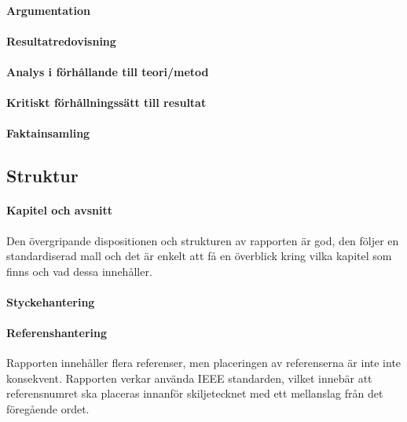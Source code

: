     \paragraph{Argumentation}

    \paragraph{Resultatredovisning}

    \paragraph{Analys i förhållande till teori/metod  }

    \paragraph{Kritiskt förhållningssätt till resultat}

    \paragraph{Faktainsamling}


    \subsection{Struktur} %
    \label{sub:struktur}
    \paragraph{Kapitel och avsnitt}
        Den övergripande dispositionen och strukturen av rapporten är god, den följer en standardiserad mall och det är enkelt att få en överblick kring vilka kapitel som finns och vad dessa innehåller. \bigskip
     
    \paragraph{Styckehantering}

    \paragraph{Referenshantering}
         Rapporten innehåller flera referenser, men placeringen av referenserna är inte inte konsekvent. Rapporten verkar använda IEEE standarden, vilket innebär att referensnumret ska placeras innanför skiljetecknet med ett mellanslag från det föregående ordet.

